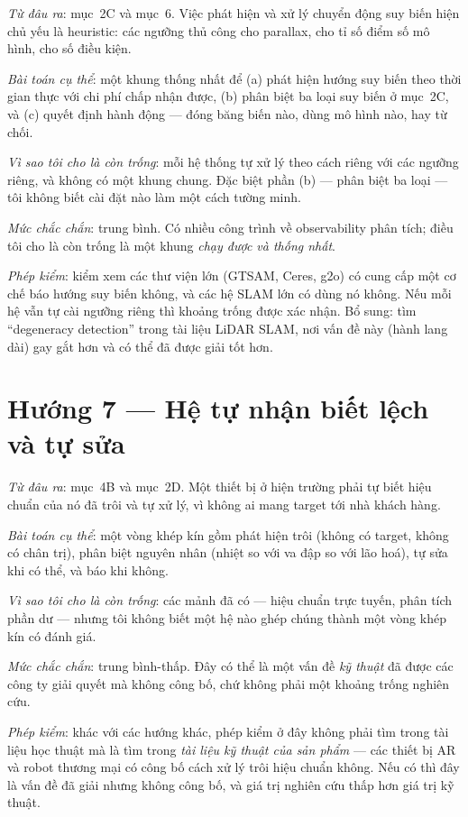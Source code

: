 \documentclass[../../vslam.tex]{subfiles}
\begin{document}
\emph{Từ đâu ra}:  mục~2C và  mục~6. Việc phát hiện và xử lý chuyển động suy biến hiện chủ yếu là heuristic: các ngưỡng thủ công cho parallax, cho tỉ số điểm số mô hình, cho số điều kiện.

\emph{Bài toán cụ thể}: một khung thống nhất để (a) phát hiện hướng suy biến theo thời gian thực với chi phí chấp nhận được, (b) phân biệt ba loại suy biến ở  mục~2C, và (c) quyết định hành động --- đóng băng biến nào, dùng mô hình nào, hay từ chối.

\emph{Vì sao tôi cho là còn trống}: mỗi hệ thống tự xử lý theo cách riêng với các ngưỡng riêng, và không có một khung chung. Đặc biệt phần (b) --- phân biệt ba loại --- tôi không biết cài đặt nào làm một cách tường minh.

\emph{Mức chắc chắn}: trung bình. Có nhiều công trình về observability phân tích; điều tôi cho là còn trống là một khung \emph{chạy được và thống nhất}.

\emph{Phép kiểm}: kiểm xem các thư viện lớn (GTSAM, Ceres, g2o) có cung cấp một cơ chế báo hướng suy biến không, và các hệ SLAM lớn có dùng nó không. Nếu mỗi hệ vẫn tự cài ngưỡng riêng thì khoảng trống được xác nhận. Bổ sung: tìm ``degeneracy detection'' trong tài liệu LiDAR SLAM, nơi vấn đề này (hành lang dài) gay gắt hơn và có thể đã được giải tốt hơn.

\section{Hướng 7 --- Hệ tự nhận biết lệch và tự sửa}

\emph{Từ đâu ra}:  mục~4B và  mục~2D. Một thiết bị ở hiện trường phải tự biết hiệu chuẩn của nó đã trôi và tự xử lý, vì không ai mang target tới nhà khách hàng.

\emph{Bài toán cụ thể}: một vòng khép kín gồm phát hiện trôi (không có target, không có chân trị), phân biệt nguyên nhân (nhiệt so với va đập so với lão hoá), tự sửa khi có thể, và báo khi không.

\emph{Vì sao tôi cho là còn trống}: các mảnh đã có --- hiệu chuẩn trực tuyến, phân tích phần dư --- nhưng tôi không biết một hệ nào ghép chúng thành một vòng khép kín có đánh giá.

\emph{Mức chắc chắn}: trung bình-thấp. Đây có thể là một vấn đề \emph{kỹ thuật} đã được các công ty giải quyết mà không công bố, chứ không phải một khoảng trống nghiên cứu.

\emph{Phép kiểm}: khác với các hướng khác, phép kiểm ở đây không phải tìm trong tài liệu học thuật mà là tìm trong \emph{tài liệu kỹ thuật của sản phẩm} --- các thiết bị AR và robot thương mại có công bố cách xử lý trôi hiệu chuẩn không. Nếu có thì đây là vấn đề đã giải nhưng không công bố, và giá trị nghiên cứu thấp hơn giá trị kỹ thuật.
\end{document}
